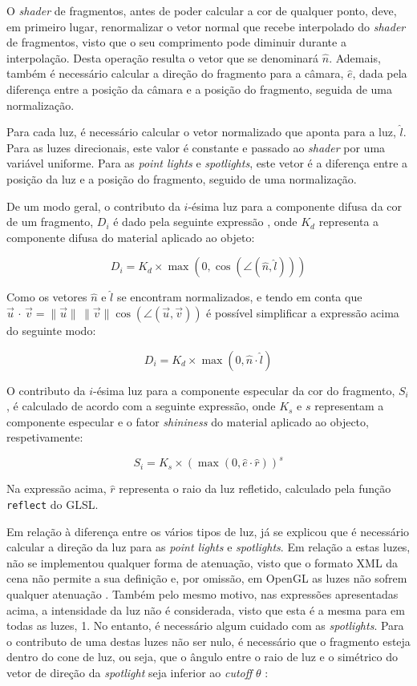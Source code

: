 \documentclass[12pt, a4paper]{article}
\begin{document}
O \emph{shader} de fragmentos, antes de poder calcular a cor de qualquer ponto, deve, em primeiro
lugar, renormalizar o vetor normal que recebe interpolado do \emph{shader} de fragmentos, visto que
o seu comprimento pode diminuir durante a interpolação. Desta operação resulta o vetor que se
denominará $\hat{n}$. Ademais, também é necessário calcular a direção do fragmento para a câmara,
$\hat{e}$, dada pela diferença entre a posição da câmara e a posição do fragmento, seguida de uma
normalização.

Para cada luz, é necessário calcular o vetor normalizado que aponta para a luz, $\hat{l}$. Para as
luzes direcionais, este valor é constante e passado ao \emph{shader} por uma variável uniforme. Para
as \emph{point lights} e \emph{spotlights}, este vetor é a diferença entre a posição da luz e a
posição do fragmento, seguido de uma normalização.

De um modo geral, o contributo da $i$-ésima luz para a componente difusa da cor de um fragmento,
$D_i$ é dado pela seguinte expressão \cite{learn-opengl-1}, onde $K_d$ representa a componente
difusa do material aplicado ao objeto:

$$
D_i = K_d \times \max \left ( 0, \cos \left ( \angle (\hat{n}, \hat{l}) \right ) \right )
$$

Como os vetores $\hat{n}$ e $\hat{l}$ se encontram normalizados, e tendo em conta que
$
\vec{u} \, \cdot \, \vec{v} =
\lVert \vec{u} \rVert \, \lVert \vec{v} \rVert \cos (\angle (\vec{u}, \vec{v}))
$
é possível simplificar a expressão acima do seguinte modo:

$$
D_i = K_d \times \max \left ( 0, \hat{n} \cdot \hat{l} \right )
$$

O contributo da $i$-ésima luz para a componente especular da cor do fragmento, $S_i$, é calculado
de acordo com a seguinte expressão, onde $K_s$ e $s$ representam a componente especular e o fator
\emph{shininess} do material aplicado ao objecto, respetivamente:

$$
S_i = K_s \times \left ( \max \left (0, \hat{e} \cdot \hat{r} \right ) \right ) ^ s
$$

Na expressão acima, $\hat{r}$ representa o raio da luz refletido, calculado pela função
\texttt{reflect} do GLSL.

Em relação à diferença entre os vários tipos de luz, já se explicou que é necessário calcular a
direção da luz para as \emph{point lights} e \emph{spotlights}. Em relação a estas luzes, não se
implementou qualquer forma de atenuação, visto que o formato XML da cena não permite a sua definição
e, por omissão, em OpenGL as luzes não sofrem qualquer atenuação \cite{glLight}. Também pelo mesmo
motivo, nas expressões apresentadas acima, a intensidade da luz não é considerada, visto que esta é
a mesma para em todas as luzes, 1. No entanto, é necessário algum cuidado com as \emph{spotlights}.
Para o contributo de uma destas luzes não ser nulo, é necessário que o fragmento esteja dentro do
cone de luz, ou seja, que o ângulo entre o raio de luz e o simétrico do vetor de direção da
\emph{spotlight} seja inferior ao \emph{cutoff} $\theta$ \cite{learn-opengl-2}:
\end{document}
